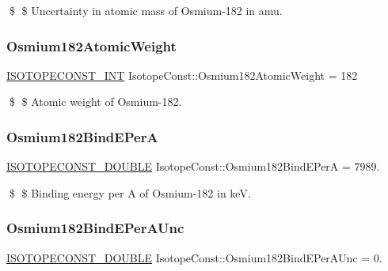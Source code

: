 \$ \$ Uncertainty in atomic mass of Osmium-\/182 in amu. \mbox{\label{group___isotope_const-_osmium-_os182_ga22bb9ff2a72cc47c3e4f3c06560adcf2}} 
\subsubsection{\texorpdfstring{Osmium182\+Atomic\+Weight}{Osmium182AtomicWeight}}
{\footnotesize\ttfamily \mbox{\hyperlink{group___isotope_const-_macros_ga5f18360b3e99483a35c32d789e62621c}{I\+S\+O\+T\+O\+P\+E\+C\+O\+N\+S\+T\+\_\+\+I\+NT}} Isotope\+Const\+::\+Osmium182\+Atomic\+Weight = 182}

\$ \$ Atomic weight of Osmium-\/182. \mbox{\label{group___isotope_const-_osmium-_os182_ga4b0c35ab2b7647cdff193ee0cdacb994}} 
\subsubsection{\texorpdfstring{Osmium182\+Bind\+E\+PerA}{Osmium182BindEPerA}}
{\footnotesize\ttfamily \mbox{\hyperlink{group___isotope_const-_macros_ga8f45a7272ce02c0b4c65c44636ed719a}{I\+S\+O\+T\+O\+P\+E\+C\+O\+N\+S\+T\+\_\+\+D\+O\+U\+B\+LE}} Isotope\+Const\+::\+Osmium182\+Bind\+E\+PerA = 7989.}

\$ \$ Binding energy per A of Osmium-\/182 in keV. \mbox{\label{group___isotope_const-_osmium-_os182_ga1a1bf01d146a30e430b29396e5f8de04}} 
\subsubsection{\texorpdfstring{Osmium182\+Bind\+E\+Per\+A\+Unc}{Osmium182BindEPerAUnc}}
{\footnotesize\ttfamily \mbox{\hyperlink{group___isotope_const-_macros_ga8f45a7272ce02c0b4c65c44636ed719a}{I\+S\+O\+T\+O\+P\+E\+C\+O\+N\+S\+T\+\_\+\+D\+O\+U\+B\+LE}} Isotope\+Const\+::\+Osmium182\+Bind\+E\+Per\+A\+Unc = 0.}

